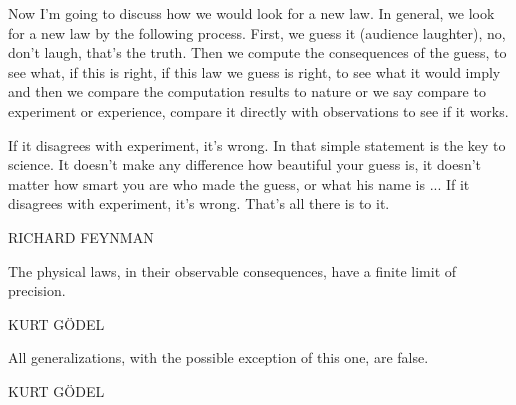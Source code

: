 
{\centering
\parbox{\textwidth}{%
  \raggedright
  {%

  Now I'm going to discuss how we would look for a new law. In general, we look for a new law by the following process. First, we guess it (audience laughter), no, don't laugh, that's the truth. Then we compute the consequences of the guess, to see what, if this is right, if this law we guess is right, to see what it would imply and then we compare the computation results to nature or we say compare to experiment or experience, compare it directly with observations to see if it works.

  If it disagrees with experiment, it's wrong. In that simple statement is the key to science. It doesn't make any difference how beautiful your guess is, it doesn't matter how smart you are who made the guess, or what his name is ... If it disagrees with experiment, it's wrong. That's all there is to it.\par\bigskip
  }
  \raggedleft\MakeUppercase{Richard Feynman}\par%
}}

\vspace{5em}

{\centering
\parbox{\textwidth}{%
  \raggedright{%

  The physical laws, in their observable consequences, have a finite limit of precision.\par\bigskip
  }
  \raggedleft\MakeUppercase{Kurt G{\"o}del}\par%
}}

\vspace{5em}
{\centering
\parbox{\textwidth}{%
  \raggedright{%

  All generalizations, with the possible exception of this one, are false.\par\bigskip
  }
  \raggedleft\MakeUppercase{Kurt G{\"o}del}\par%
}}

\vfill




